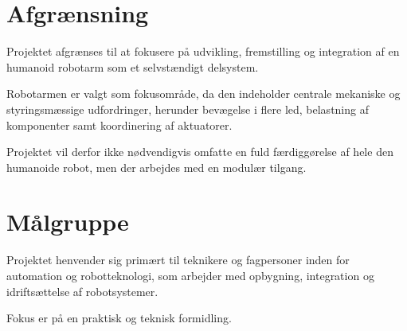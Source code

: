 \clearpage
\section*{Afgrænsning}

Projektet afgrænses til at fokusere på udvikling, fremstilling og
integration af en humanoid robotarm som et selvstændigt delsystem.

Robotarmen er valgt som fokusområde, da den indeholder centrale
mekaniske og styringsmæssige udfordringer, herunder bevægelse i
flere led, belastning af komponenter samt koordinering af aktuatorer.

Projektet vil derfor ikke nødvendigvis omfatte en fuld
færdiggørelse af hele den humanoide robot, men der arbejdes med en
modulær tilgang.

\section*{Målgruppe}

Projektet henvender sig primært til teknikere og fagpersoner inden
for automation og robotteknologi, som arbejder med opbygning,
integration og idriftsættelse af robotsystemer.

Fokus er på en praktisk og teknisk formidling.
